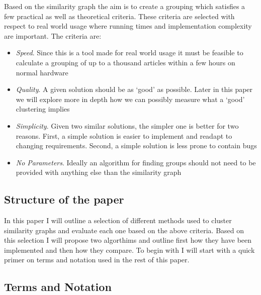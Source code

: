 Based on the similarity graph the aim is to create a grouping which 
satisfies a few practical as well as theoretical criteria. These 
criteria are selected with respect to real world usage where running 
times and implementation complexity are important.  The criteria are:
\begin{itemize}
	\item{\emph{Speed}. Since this is a tool made for real world usage 
		it must be feasible to calculate a grouping of up to a thousand 
	articles within a few hours on normal hardware}
	\item{\emph{Quality}. A given solution should be as `good' as 
		possible.  Later in this paper we will explore more in depth how 
	we can possibly measure what a `good' clustering implies}
	\item{\emph{Simplicity}. Given two similar solutions, the simpler 
		one is better for two reasons. First, a simple solution is 
	easier to implement and readapt to changing requirements. Second, a 
simple solution is less prone to contain bugs}
	\item{\emph{No Parameters}. Ideally an algorithm for finding groups 
		should not need to be provided with anything else than the 
	similarity graph}
\end{itemize}

\subsection{Structure of the paper}

In this paper I will outline a selection of different methods used to 
cluster similarity graphs and evaluate each one based on the above 
criteria. Based on this selection I will propose two algorthims and 
outline first how they have been implemented and then how they compare.  
To begin with I will start with a quick primer on terms and notation 
used in the rest of this paper.

\subsection{Terms and Notation}

